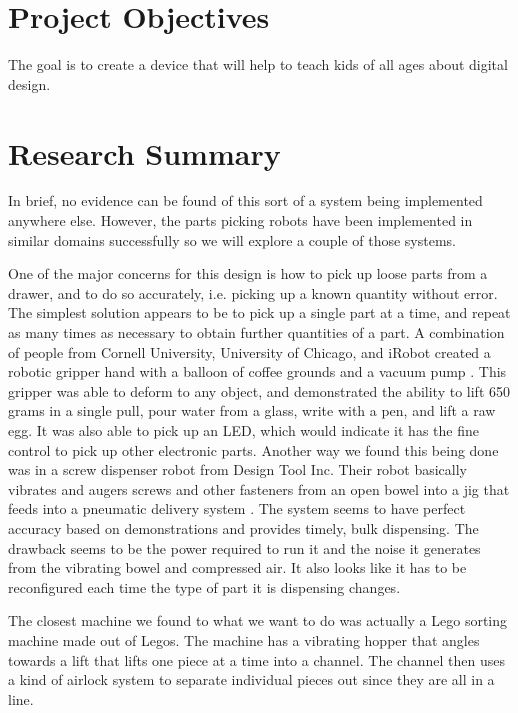 \documentclass[12pt]{report}
\begin{document}
\section*{Project Objectives}

The goal is to create a device that will help to teach kids of all ages about digital design.

\section*{Research Summary}
In brief, no evidence can be found of this sort of a system being implemented anywhere else. However, the parts picking robots have been implemented in similar domains successfully so we will explore a couple of those systems. 
	
	
One of the major concerns for this design is how to pick up loose parts from a drawer, and to do so accurately, i.e. picking up a known quantity without error.  The simplest solution appears to be to pick up a single part at a time, and repeat as many times as necessary to obtain further quantities of a part.  A combination of people from Cornell University, University of Chicago, and iRobot created a robotic gripper hand with a balloon of coffee grounds and a vacuum pump \cite{universalGrabber}.  This gripper was able to deform to any object, and demonstrated the ability to lift 650 grams in a single pull, pour water from a glass, write with a pen, and lift a raw egg.  It was also able to pick up an LED, which would indicate it has the fine control to pick up other electronic parts.  Another way we found this being done was in a screw dispenser robot from Design Tool Inc. Their robot basically vibrates and augers screws and other fasteners from an open bowel into a jig that feeds into a pneumatic delivery system \cite{screwDispenser}. The system seems to have perfect accuracy based on demonstrations and provides timely, bulk dispensing. The drawback seems to be the power required to run it and the noise it generates from the vibrating bowel and compressed air. It also looks like it has to be reconfigured each time the type of part it is dispensing changes.


The closest machine we found to what we want to do was actually a Lego sorting machine made out of Legos. The machine has a vibrating hopper that angles towards a lift that lifts one piece at a time into a channel. The channel then uses a kind of airlock system to separate individual pieces out since they are all in a line\cite{legoSorter}.
\end{document}
